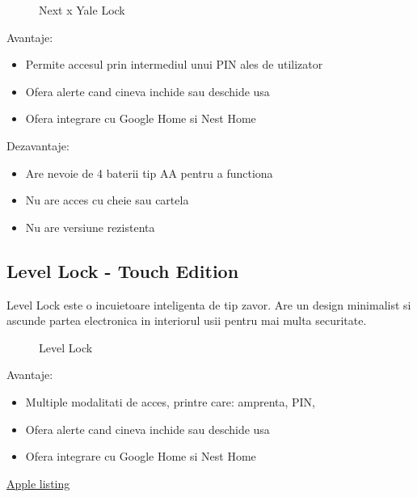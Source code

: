 \begin{figure}[h!]
  \centering
  \caption{Next x Yale Lock \cite{YaleLock}}
\end{figure}

Avantaje:
\begin{itemize}
  \item Permite accesul prin intermediul unui PIN ales de utilizator
  \item Ofera alerte cand cineva inchide sau deschide usa
  \item Ofera integrare cu Google Home si Nest Home
\end{itemize}

Dezavantaje:
\begin{itemize}
  \item Are nevoie de 4 baterii tip AA pentru a functiona
  \item Nu are acces cu cheie sau cartela
  \item Nu are versiune rezistenta
\end{itemize}


\subsection {Level Lock - Touch Edition}

Level Lock este o incuietoare inteligenta de tip zavor. Are un design minimalist si ascunde partea electronica in interiorul usii pentru mai multa securitate.

\begin{figure}[h!]
  \centering
  \caption{Level Lock \cite{LevelLock}}
\end{figure}

Avantaje:
\begin{itemize}
  \item Multiple modalitati de acces, printre care: amprenta, PIN, 
  \item Ofera alerte cand cineva inchide sau deschide usa
  \item Ofera integrare cu Google Home si Nest Home
\end{itemize}


\href{https://www.apple.com/shop/product/HPFY2ZM/A/level-lock-touch-edition?fnode=648f1e74ceef61358f897cd3f7cdb053262fd38bbffcd78c49f653a17d8b06312e1d22bd76ab325e817a33264364be774af0cc44d3ce62d8efcc0301ce4fbedabf176781e07520161f01ce6f69b6cb8ad4774b3cc302ff5d1dfc2d1524cf313aaeb1b1323955c95e3319224270e9b632&fs=fh%3D482b%252B45ae}{Apple listing}

